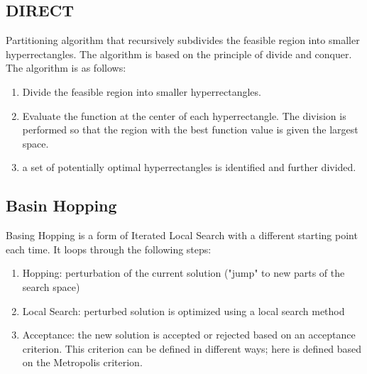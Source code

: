 \subsection{DIRECT}
Partitioning algorithm that recursively subdivides the feasible region into smaller hyperrectangles. The algorithm is based on the principle of divide and conquer. The algorithm is as follows:
\begin{enumerate}
    \item Divide the feasible region into smaller hyperrectangles.
    \item Evaluate the function at the center of each hyperrectangle. The division is performed so that the region with the best function value is given the largest space.
    \item a set of potentially optimal hyperrectangles is identified and further divided.
\end{enumerate}

\subsection{Basin Hopping}
Basing Hopping is a form of Iterated Local Search with a different starting point each time. It loops through the following steps:
\begin{enumerate}
    \item Hopping: perturbation of the current solution ("jump" to new parts of the search space)
    \item Local Search: perturbed solution is optimized using a local search method
    \item Acceptance: the new solution is accepted or rejected based on an acceptance criterion. This criterion can be defined in different ways; here is defined based on the Metropolis criterion.
\end{enumerate}

